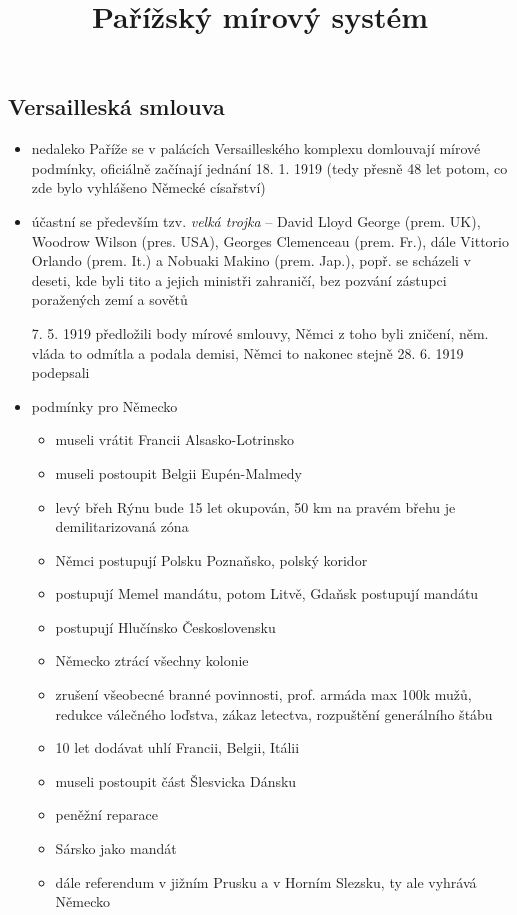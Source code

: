 \documentclass{article}
\title{\vspace{-2cm}Pařížský mírový systém\vspace{-1.7cm}}
\date{}
\author{}
\begin{document}
\maketitle


\subsection*{Versailleská smlouva}
\begin{itemize}
  \item nedaleko Paříže se v palácích Versailleského komplexu domlouvají mírové podmínky, oficiálně začínají jednání 18. 1. 1919 (tedy přesně 48 let potom, co zde bylo vyhlášeno Německé císařství)
  \item účastní se především tzv. \textit{velká trojka} -- David Lloyd George (prem. UK), Woodrow Wilson (pres. USA), Georges Clemenceau (prem. Fr.), dále Vittorio Orlando (prem. It.) a Nobuaki Makino (prem. Jap.), popř. se scházeli v deseti, kde byli tito a jejich ministři zahraničí, bez pozvání zástupci poražených zemí a sovětů
  \item[7. 5. 1919] předložili body mírové smlouvy, Němci z toho byli zničení, něm. vláda to odmítla a podala demisi, Němci to nakonec stejně 28. 6. 1919 podepsali
  \item podmínky pro Německo
  \begin{itemize}
    \item museli vrátit Francii Alsasko-Lotrinsko
    \item museli postoupit Belgii Eupén-Malmedy
    \item levý břeh Rýnu bude 15 let okupován, 50 km na pravém břehu je demilitarizovaná zóna
    \item Němci postupují Polsku Poznaňsko, polský koridor
    \item postupují Memel mandátu, potom Litvě, Gdaňsk postupují mandátu
    \item postupují Hlučínsko Československu
    \item Německo ztrácí všechny kolonie
    \item zrušení všeobecné branné povinnosti, prof. armáda max 100k mužů, redukce válečného loďstva, zákaz letectva, rozpuštění generálního štábu
    \item 10 let dodávat uhlí Francii, Belgii, Itálii
    \item museli postoupit část Šlesvicka Dánsku
    \item peněžní reparace
    \item Sársko jako mandát
    \item dále referendum v jižním Prusku a v Horním Slezsku, ty ale vyhrává Německo
  \end{itemize}
\end{itemize}
\end{document}
